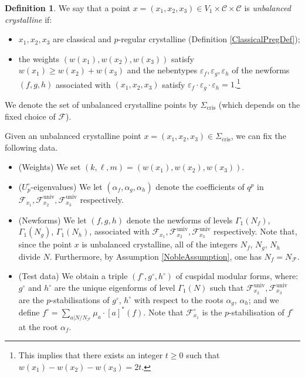 \documentclass[10pt, oneside]{amsart}
\numberwithin{equation}{subsection}
\theoremstyle{definition}
\newtheorem{definition}[equation]{Definition}
\theoremstyle{remark}
\newcommand{\opn}[1]{\operatorname{#1}}
\begin{document}
\begin{definition}
    We say that a point $x = (x_1, x_2, x_3) \in V_1 \times \mathcal{C} \times \mathcal{C}$ is \emph{unbalanced crystalline} if:
    \begin{itemize}
        \item $x_1, x_2, x_3$ are classical and $p$-regular crystalline (Definition \ref{ClassicalPregDef});
        \item the weights $(w(x_1), w(x_2), w(x_3))$ satisfy $w(x_1) \geq w(x_2) + w(x_3)$ and the nebentypes $\varepsilon_f, \varepsilon_g, \varepsilon_h$ of the newforms $(f, g, h)$ associated with $(x_1, x_2, x_3)$ satisfy $\varepsilon_f \cdot \varepsilon_g \cdot \varepsilon_h = 1$.\footnote{This implies that there exists an integer $t \geq 0$ such that $w(x_1) - w(x_2) - w(x_3) = 2t$.}
    \end{itemize}
    We denote the set of unbalanced crystalline points by $\Sigma_{\opn{cris}}$ (which depends on the fixed choice of $\mathcal{F}$).
\end{definition}

Given an unbalanced crystalline point $x = (x_1, x_2, x_3) \in \Sigma_{\opn{cris}}$, we can fix the following data.
\begin{itemize}
    \item (Weights) We set $(k, \ell, m) = (w(x_1), w(x_2), w(x_3))$.
    \item ($U_p^{\circ}$-eigenvalues) We let $(\alpha_f, \alpha_{g}, \alpha_h)$ denote the coefficients of $q^p$ in $\mathcal{F}_{x_1}, \mathcal{F}^{\opn{univ}}_{x_2}, \mathcal{F}^{\opn{univ}}_{x_3}$ respectively.
    \item (Newforms) We let $(f, g, h)$ denote the newforms of levels $\Gamma_1(N_f)$, $\Gamma_1(N_g)$, $\Gamma_1(N_h)$, associated with $\mathcal{F}_{x_1}, \mathcal{F}^{\opn{univ}}_{x_2}, \mathcal{F}^{\opn{univ}}_{x_3}$ respectively. Note that, since the point $x$ is unbalanced crystalline, all of the integers $N_f$, $N_g$, $N_h$ divide $N$. Furthermore, by Assumption \ref{NobleAssumption}, one has $N_f = N_{\mathcal{F}}$.
    \item (Test data) We obtain a triple $(f^{\circ}, g^{\circ}, h^{\circ})$ of cuspidal modular forms, where: $g^{\circ}$ and $h^{\circ}$ are the unique eigenforms of level $\Gamma_1(N)$ such that $\mathcal{F}^{\opn{univ}}_{x_2}, \mathcal{F}^{\opn{univ}}_{x_3}$ are the $p$-stabilisations of $g^{\circ}$, $h^{\circ}$ with respect to the roots $\alpha_g$, $\alpha_h$; and we define $f^{\circ} = \sum_{a | N/N_{\mathcal{F}}} \mu_a \cdot [a]^*(f)$. Note that $\mathcal{F}^{\circ}_{x_1}$ is the $p$-stabilisation of $f^{\circ}$ at the root $\alpha_f$.
\end{itemize}
\end{document}
